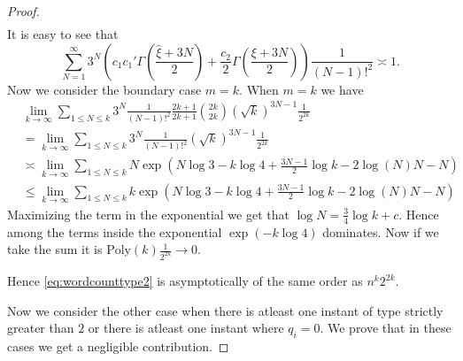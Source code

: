 \documentclass[12pt]{article}
\numberwithin{equation}{section}
\numberwithin{equation}{section}
\theoremstyle{definition}
\renewcommand{\1}{\bf 1}
\begin{document}
\begin{proof}
\begin{equation}
\begin{split}
\end{split}
\end{equation} 
It is easy to see that 
\begin{equation}
\sum_{N =1}^{\infty} 3^{N} \left( c_{1}c_{1}'\Gamma\left( \frac{\hat{\xi}+3N}{2}\right) + \frac{c_{2}}{2} \Gamma\left( \frac{\xi+3N}{2} \right) \right)\frac{1}{(N-1)!^2}\asymp 1.
\end{equation}
Now we consider the boundary case $m=k$. When $m=k$ we have 
\begin{equation}\label{eq:boundary1}
\begin{split}
&\lim_{k \to \infty}\sum_{1\le N \le k}3^{N}\frac{1}{(N-1)!^2} \frac{2k+1}{2k+1}\binom{2k}{2k} \left( \sqrt{k} \right)^{3N-1}\frac{1}{2^{2k}}\\
&=\lim_{k \to \infty} \sum_{1 \le N \le k} 3^{N}\frac{1}{(N-1)!^2}\left( \sqrt{k} \right)^{3N-1}\frac{1}{2^{2k}}\\
&\asymp \lim_{k \to \infty}\sum_{1\le N \le k} N\exp\left(N\log 3- k\log 4 + \frac{3N-1}{2}\log k - 2\log(N)N- N  \right)\\
& \le \lim_{k \to \infty}\sum_{1\le N \le k} k \exp\left( N\log 3- k\log 4 + \frac{3N-1}{2}\log k - 2\log(N)N- N \right)
\end{split}
\end{equation} 
Maximizing the term in the exponential we get that $\log N = \frac{3}{4}\log k +c$. Hence among the terms inside the exponential $\exp(-k\log 4)$ dominates. Now if we take the sum it is $\text{Poly}(k)\frac{1}{2^{2k}} \to 0.$

\noindent 
Hence \eqref{eq:wordcounttype2} is asymptotically of the same order as $n^{k}2^{2k}$. 

Now we consider the other case when there is atleast one instant of type strictly greater than $2$ or there is atleast one instant where $q_{i}=0$. We prove that in these cases we get a negligible contribution. 


\end{proof}
\end{document}
